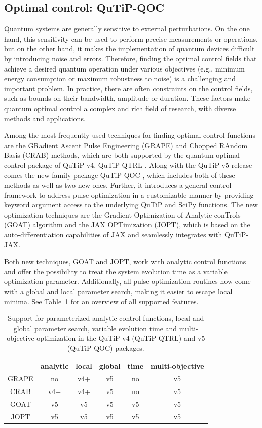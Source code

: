 \documentclass[preprint,3p,sort&compress]{elsarticle}
\begin{document}
\subsection{Optimal control: \textup{QuTiP-QOC}}
Quantum systems are generally sensitive to external perturbations. On the one hand, this sensitivity can be used to perform precise measurements or operations, but on the other hand, it makes the implementation of quantum devices difficult by introducing noise and errors.
Therefore, finding the optimal control fields that achieve a desired quantum operation under various objectives (e.g., minimum energy consumption or maximum robustness to noise) is a challenging and important problem. 
In practice, there are often constraints on the control fields, such as bounds on their bandwidth, amplitude or duration. 
These factors make quantum optimal control a complex and rich field of research, with diverse methods and applications.

Among the most frequently used techniques for finding optimal control functions are the GRadient Ascent Pulse Engineering (GRAPE) and Chopped RAndom Basis (CRAB) methods, which are both supported by the quantum optimal control package of QuTiP v4, QuTiP-QTRL \cite{crab, grape, qqtrl}. 
Along with the QuTiP v5 release comes the new family package QuTiP-QOC \cite{qqoc}, which includes both of these methods as well as two new ones.
Further, it introduces a general control framework to address pulse optimization in a customizable manner by providing keyword argument access to the underlying QuTiP and SciPy functions.
The new optimization techniques are the Gradient Optimization of Analytic conTrols (GOAT) algorithm \cite{MachnesGOAT} and the JAX OPTimization (JOPT), which is based on the auto-differentiation \cite{Goerz2022} capabilities of JAX and seamlessly integrates with QuTiP-JAX.

Both new techniques, GOAT and JOPT, work with analytic control functions and offer the possibility to treat the system evolution time as a variable optimization parameter.
Additionally, all pulse optimization routines now come with a global and local parameter search, making it easier to escape local minima. 
See Table~\ref{tab:qoc} for an overview of all supported features.

\begin{table}
    \centering
    \begin{tabular}{c|c|c|c|c|c}
        & analytic & local & global & time & multi-objective  \\ \hline
        GRAPE   & no & v4+ & v5 & no  & v5 \\
        CRAB    & v4+ & v4+ & v5 & no  & v5 \\
        GOAT    & v5 & v5 & v5 & v5 & v5 \\
        JOPT    & v5 & v5 & v5 & v5 & v5 \\
    \end{tabular}
    \caption{Support for parameterized analytic control functions, local and global parameter search, variable evolution time and multi-objective optimization in the QuTiP v4 (QuTiP-QTRL) and v5 (QuTiP-QOC) packages.}
    \label{tab:qoc}
\end{table}
\end{document}
